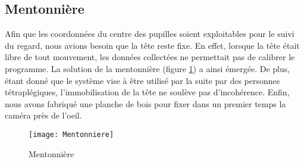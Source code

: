 \subsection{Mentonnière}

Afin que les coordonnées du centre des pupilles soient exploitables pour le suivi du regard, nous avions besoin que la tête reste fixe. En effet, lorsque la tête était libre de tout mouvement, les données collectées ne permettait pas de calibrer le programme. La solution de la mentonnière (figure \ref{fig:Menton}) a ainsi émergée. De plus, étant donné que le système vise à être utilisé par la suite par des personnes tétraplégiques, l'immobilisation de la tête ne soulève pas d'incohérence.
Enfin, nous avons fabriqué une planche de bois pour fixer dans un premier temps la caméra près de l'oeil. 

\begin{figure}[H]
  \centering
  \texttt{[image: Mentonniere]}
  \caption{Mentonnière}
  \label{fig:Menton}
\end{figure}